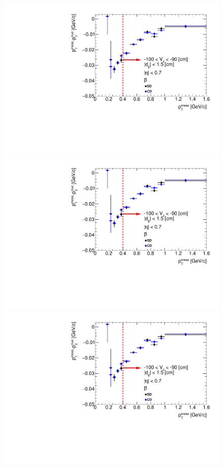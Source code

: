\begin{figure}[H]
{}~
\parbox{0.329\textwidth}{
  \includegraphics[width=\linewidth,page=24]{graphics/energyLoss/energyLoss3DGlobal_OnePrtAlso.pdf}\\
  \includegraphics[width=\linewidth,page=27]{graphics/energyLoss/energyLoss3DGlobal_OnePrtAlso.pdf}\\
  \includegraphics[width=\linewidth,page=30]{graphics/energyLoss/energyLoss3DGlobal_OnePrtAlso.pdf}\\
}
\end{figure}
